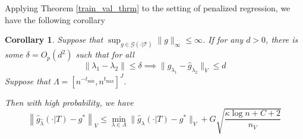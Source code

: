 \documentclass[12pt]{article}
\newtheorem{corollary}{Corollary}
\begin{document}
Applying Theorem \ref{train_val_thrm} to the setting of penalized regression, we have the following corollary

\begin{corollary}
\label{train_val_corr}
Suppose that $\sup_{g \in \mathcal{G(\cdot | T)}} \| g \|_\infty \le \infty$.
If for any $d> 0$, there is some $\delta = O_p(d^2)$ such that for all
\begin{equation}
\| \lambda_1 - \lambda_2 \| \le \delta \implies \| \hat{g}_{\lambda_1} - \hat{g}_{\lambda_2} \|_V \le d
\end{equation}
Suppose that $\Lambda = [ n^{-t_{\min}}, n^{t_{\max}} ]^J $.

Then with high probability, we have
\begin{equation}
\label{error_bound}
\left \|\hat{g}_{\hat{\lambda} }(\cdot | T) - g^* \right \|_V
\le 
\min_{\lambda \in \Lambda}\| \hat{g}_{\lambda}(\cdot | T) - g^*\|_V
+ G \sqrt{\frac{\kappa \log n + C + 2}{n_V}}
\end{equation}
\end{corollary}
\end{document}
